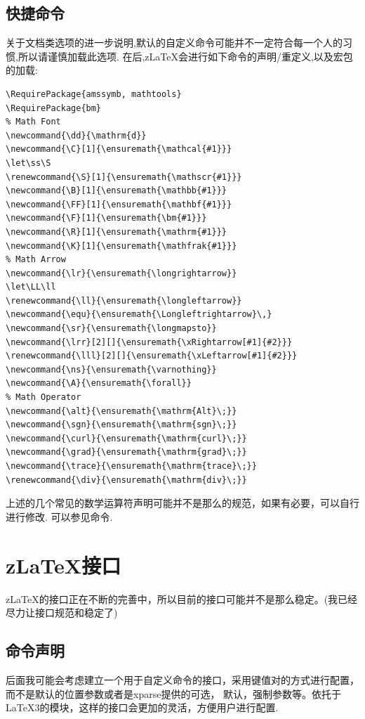 \subsection{快捷命令}
关于文档类选项的进一步说明,默认的自定义命令可能并不一定符合每一个人的习惯,所以请谨慎加载此选项.
在后,z\LaTeX{}会进行如下命令的声明/重定义,以及宏包的加载:
\begin{verbatim}
\RequirePackage{amssymb, mathtools}
\RequirePackage{bm}          
% Math Font 
\newcommand{\dd}{\mathrm{d}}
\newcommand{\C}[1]{\ensuremath{\mathcal{#1}}}
\let\ss\S
\renewcommand{\S}[1]{\ensuremath{\mathscr{#1}}}
\newcommand{\B}[1]{\ensuremath{\mathbb{#1}}}
\newcommand{\FF}[1]{\ensuremath{\mathbf{#1}}}
\newcommand{\F}[1]{\ensuremath{\bm{#1}}}
\newcommand{\R}[1]{\ensuremath{\mathrm{#1}}}
\newcommand{\K}[1]{\ensuremath{\mathfrak{#1}}}
% Math Arrow 
\newcommand{\lr}{\ensuremath{\longrightarrow}}
\let\LL\ll
\renewcommand{\ll}{\ensuremath{\longleftarrow}}
\newcommand{\equ}{\ensuremath{\Longleftrightarrow}\,}
\newcommand{\sr}{\ensuremath{\longmapsto}}
\newcommand{\lrr}[2][]{\ensuremath{\xRightarrow[#1]{#2}}}
\renewcommand{\lll}[2][]{\ensuremath{\xLeftarrow[#1]{#2}}}
\newcommand{\ns}{\ensuremath{\varnothing}}
\newcommand{\A}{\ensuremath{\forall}}
% Math Operator
\newcommand{\alt}{\ensuremath{\mathrm{Alt}\;}}
\newcommand{\sgn}{\ensuremath{\mathrm{sgn}\;}}
\newcommand{\curl}{\ensuremath{\mathrm{curl}\;}}
\newcommand{\grad}{\ensuremath{\mathrm{grad}\;}}
\newcommand{\trace}{\ensuremath{\mathrm{trace}\;}}
\renewcommand{\div}{\ensuremath{\mathrm{div}\;}}
\end{verbatim}

上述的几个常见的数学运算符声明可能并不是那么的规范，如果有必要，可以自行进行修改.
可以参见命令\cmd{\DeclareMathOperator}.

\section{z\LaTeX{}接口}
z\LaTeX{}的接口正在不断的完善中，所以目前的接口可能并不是那么稳定。(我已经尽力让接口规范和稳定了)

\subsection{命令声明}
后面我可能会考虑建立一个用于自定义命令的接口，采用键值对的方式进行配置，而不是默认的位置参数或者是xparse提供的可选，
默认，强制参数等。依托于\LaTeX3的模块，这样的接口会更加的灵活，方便用户进行配置.

